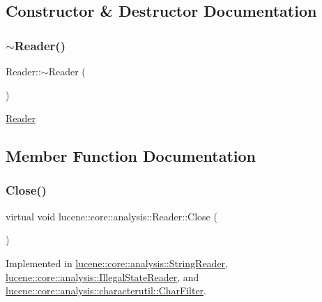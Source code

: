 \subsection{Constructor \& Destructor Documentation}
\mbox{\label{classlucene_1_1core_1_1analysis_1_1Reader_a78089542fd27a0ac2df6702fffe8725c}} 
\subsubsection{\texorpdfstring{$\sim$\+Reader()}{~Reader()}}
{\footnotesize\ttfamily Reader\+::$\sim$\+Reader (\begin{DoxyParamCaption}{ }\end{DoxyParamCaption})\hspace{0.3cm}{\ttfamily [virtual]}}

\mbox{\hyperlink{classlucene_1_1core_1_1analysis_1_1Reader}{Reader}} 

\subsection{Member Function Documentation}
\mbox{\label{classlucene_1_1core_1_1analysis_1_1Reader_a4be7e96dccdd3e276e3450e3ad7a70f4}} 
\subsubsection{\texorpdfstring{Close()}{Close()}}
{\footnotesize\ttfamily virtual void lucene\+::core\+::analysis\+::\+Reader\+::\+Close (\begin{DoxyParamCaption}{ }\end{DoxyParamCaption})\hspace{0.3cm}{\ttfamily [pure virtual]}}



Implemented in \mbox{\hyperlink{classlucene_1_1core_1_1analysis_1_1StringReader_ac2938d531e7842abb8423149982328e3}{lucene\+::core\+::analysis\+::\+String\+Reader}}, \mbox{\hyperlink{classlucene_1_1core_1_1analysis_1_1IllegalStateReader_aa92b3c9c3da611e2e44c3edf4078dbe6}{lucene\+::core\+::analysis\+::\+Illegal\+State\+Reader}}, and \mbox{\hyperlink{classlucene_1_1core_1_1analysis_1_1characterutil_1_1CharFilter_a47ff3dc61979b80927ed5779cb55bd09}{lucene\+::core\+::analysis\+::characterutil\+::\+Char\+Filter}}.

